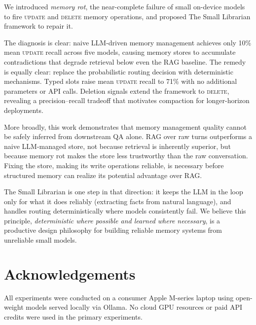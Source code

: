 \documentclass[10pt, twocolumn]{article}
\begin{document}
We introduced \emph{memory rot}, the near-complete failure of small
on-device models to fire \textsc{update} and \textsc{delete} memory
operations, and proposed The Small Librarian framework to repair it.

The diagnosis is clear: naive LLM-driven memory management achieves only
10\% mean \textsc{update} recall across five models, causing memory stores to
accumulate contradictions that degrade retrieval below even the RAG baseline.
The remedy is equally clear: replace the probabilistic routing decision with
deterministic mechanisms.
Typed slots raise mean \textsc{update} recall to 71\% with no additional
parameters or API calls.
Deletion signals extend the framework to \textsc{delete}, revealing a
precision--recall tradeoff that motivates compaction for longer-horizon
deployments.

More broadly, this work demonstrates that memory management quality cannot
be safely inferred from downstream QA alone.
RAG over raw turns outperforms a naive LLM-managed store, not because
retrieval is inherently superior, but because memory rot makes the store
less trustworthy than the raw conversation.
Fixing the store, making its write operations reliable, is necessary
before structured memory can realize its potential advantage over RAG.

The Small Librarian is one step in that direction: it keeps the LLM in
the loop only for what it does reliably (extracting facts from natural
language), and handles routing deterministically where models consistently
fail.
We believe this principle, \emph{deterministic where possible and learned
where necessary}, is a productive design philosophy for building reliable
memory systems from unreliable small models.

\section*{Acknowledgements}

All experiments were conducted on a consumer Apple M-series laptop using
open-weight models served locally via Ollama.
No cloud GPU resources or paid API credits were used in the primary
experiments.

\end{document}
